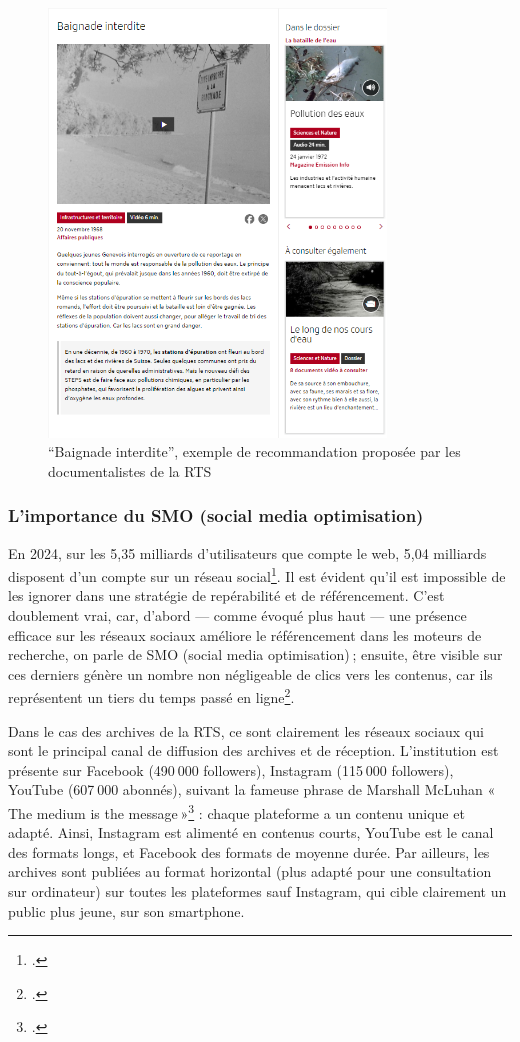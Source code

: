 \begin{figure}[h!]
	\centering
	\includegraphics[width=0.8\textwidth]{images/image8.png}
	\caption{\enquote{Baignade interdite}, exemple de recommandation proposée par les documentalistes de la RTS}
	\label{fig:image8}
\end{figure}


\subsubsection{L'importance du SMO (social media optimisation)}


En 2024, sur les 5,35 milliards d’utilisateurs que compte le web, 5,04 milliards disposent d’un compte sur un réseau social\footcite{zotero-229}. Il est évident qu’il est impossible de les ignorer dans une stratégie de repérabilité et de référencement. C’est doublement vrai, car, d’abord — comme évoqué plus haut — une présence efficace sur les réseaux sociaux améliore le référencement dans les moteurs de recherche, on parle de SMO (social media optimisation) ; ensuite, être visible sur ces derniers génère un nombre non négligeable de clics vers les contenus, car ils représentent un tiers du temps passé en ligne\footcite{zotero-227}.

Dans le cas des archives de la RTS, ce sont clairement les réseaux sociaux qui sont le principal canal de diffusion des archives et de réception. L’institution est présente sur Facebook (490 000 followers), Instagram (115 000 followers), YouTube (607 000 abonnés), suivant la fameuse phrase de Marshall McLuhan « The medium is the message »\footcite{zotero-226} : chaque plateforme a un contenu unique et adapté. Ainsi, Instagram est alimenté en contenus courts, YouTube est le canal des formats longs, et Facebook des formats de moyenne durée. Par ailleurs, les archives sont publiées au format horizontal (plus adapté pour une consultation sur ordinateur) sur toutes les plateformes sauf Instagram, qui cible clairement un public plus jeune, sur son smartphone.


